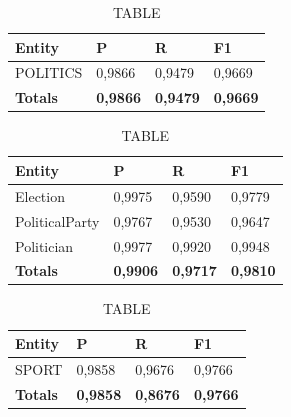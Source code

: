 \documentclass[thesis=M,english]{FITthesis}[2018/05/30]
\begin{document}

	\begin{table}[H]\centering
		\caption{TABLE}
		\label{}
		\begin{tabular}{|l|l|l|l|}
			\hline {\textbf{Entity}} & {\textbf{P}} & {\textbf{R}} & {\textbf{F1}}\\\hline
				POLITICS & 0,9866 & 0,9479 & 0,9669\\\hline
				\textbf{Totals} & \textbf{0,9866} & \textbf{0,9479} & \textbf{0,9669}\\\hline
		\end{tabular}
	\end{table}

	\begin{table}[H]\centering
		\caption{TABLE}
		\label{}
		\begin{tabular}{|l|l|l|l|}
			\hline {\textbf{Entity}} & {\textbf{P}} & {\textbf{R}} & {\textbf{F1}}\\\hline
				Election & 0,9975 & 0,9590 & 0,9779\\
				PoliticalParty & 0,9767 & 0,9530 & 0,9647\\
				Politician & 0,9977 & 0,9920 & 0,9948\\\hline
				\textbf{Totals} & \textbf{0,9906} & \textbf{0,9717} & \textbf{0,9810}\\\hline
		\end{tabular}
	\end{table}	
	

	\begin{table}[H]\centering
		\caption{TABLE}
		\label{}
		\begin{tabular}{|l|l|l|l|}
			\hline {\textbf{Entity}} & {\textbf{P}} & {\textbf{R}} & {\textbf{F1}}\\\hline
				SPORT & 0,9858 & 0,9676 & 0,9766\\\hline
				\textbf{Totals} & \textbf{0,9858} & \textbf{0,8676} & \textbf{0,9766}\\\hline
		\end{tabular}
	\end{table}
\end{document}
